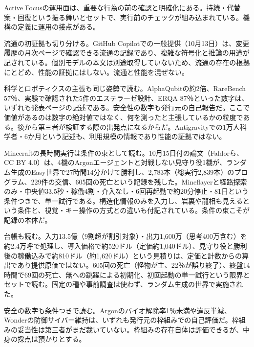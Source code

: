 \documentclass[lualatex,a4paper,10pt]{jlreq}
\begin{document}
Active Focusの運用面は、重要な行為の前の確認と明確化にある。持続・代替案・回復という振る舞いとセットで、実行前のチェックが組み込まれている。機構の定義に運用の接点がある。
\cite{B01,B62,B63,B02,B64,B03}


流通の初証拠も切り分ける。GitHub Copilotでの一般提供（10月13日）は、変更履歴の月次ページで確認できる流通の記録であり、複雑な符号化と推論の用途が記されている。個別モデルの本文は別途取得していないため、流通の存在の根拠にとどめ、性能の証拠にはしない。流通と性能を混ぜない。
\cite{B05,B65,B08,B04,B07,B06}


科学とロボティクスの主張も同じ姿勢で読む。AlphaQubitの約2倍、RareBench 57％、実験で確認された5件のエステラーゼ設計、ERQA 87％といった数字は、いずれも発表ページの記述である。安全性の数字も発行元の自己報告だ。ここで価値があるのは数字の絶対値ではなく、何を測ったと主張しているかの粒度である。後から第三者が検証する際の出発点になるからだ。Antigravityでの1万人科学者・6か月という記述も、利用規模の情報であり性能の証拠ではない。
\cite{B05,B65,B08,B04,B07,B06}


Minecraftの長時間実行は条件の束として読む。10月15日付の論文（Faldorら、CC BY 4.0）は、4機のArgonエージェントと対戦しない見守り役1機が、ランダム生成のEasy世界で27時間14分かけて勝利し、2,783本（総実行2,839本）のプログラム、229件の交信、605回の死亡という記録を残した。Mineflayerと経路探索のみ・中央値33.5秒・稼働4割・介入なし・6回再起動で約20分停止・81日という条件つきで、単一試行である。構造化情報のみを入力し、岩裏や龍相も見えるという条件と、視覚・キー操作の方式との違いも付記されている。条件の束こそが記録の本体だ。
\cite{B05,B65,B08,B04,B07,B06}


台帳も読む。入力13.5億（9割超が割引対象）・出力1,600万（思考400万含む）を約2.4万呼で処理し、導入価格で約520ドル（定価約1,040ドル）、見守り役と勝利後の稼働込みで約810ドル（約1,620ドル）という見積りは、定価と計数からの算出であり提供原価ではない。605回の死亡（怪物が主、22％が誤り終了）、終盤14時間で69回の死亡、無への跳躍による初期化、初回起動の単一試行という限界とセットで読む。固定の種や事前調査は使わず、ランダム生成の世界で実施された。
\cite{B05,B65,B08,B04,B07,B06}


安全の数字も条件つきで読む。Argonのバイオ解除率1％未満や違反半減、Wonderの防御サイバー維持は、いずれも発行元の枠組みでの自己評価だ。枠組みの妥当性は第三者がまだ裁いていない。枠組みの存在自体は評価できるが、中身の採点は預かりとする。
\cite{B01,B62,B63,B02,B64,B03,B05,B65,B08,B04,B07,B06}
\end{document}
